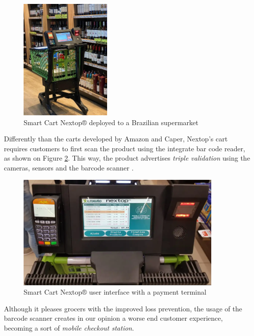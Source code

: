 \documentclass[openright]{normas-utf-tex} %
\begin{document}
\begin{figure}[H]
	\centering
	\includegraphics[width=0.4\textwidth]{./images/nextop.jpeg}
	\caption[Smart Cart Nextop® deployed to a Brazilian supermarket]{Smart Cart Nextop® deployed to a Brazilian supermarket}
	\label{fig:nextop}
\end{figure}

Differently than the carts developed by Amazon and Caper, Nextop's cart
requires customers to first scan the product using the integrate bar code
reader, as shown on Figure \ref{fig:nextopui}. This way, the product advertises
\textit{triple validation} using the cameras, sensors and the barcode scanner \cite{Nextop2022}.

\begin{figure}[H]
	\centering
	\includegraphics[width=0.9\textwidth]{./images/nextop2.png}
    \caption[Smart Cart Nextop® user interface with a payment terminal]{Smart Cart Nextop® user interface with a payment terminal}
	\label{fig:nextopui}
\end{figure}

Although it pleases grocers with the improved loss prevention, the usage of the barcode scanner creates in our opinion a worse
end customer experience, becoming a sort of \textit{mobile checkout station}.
\end{document}
